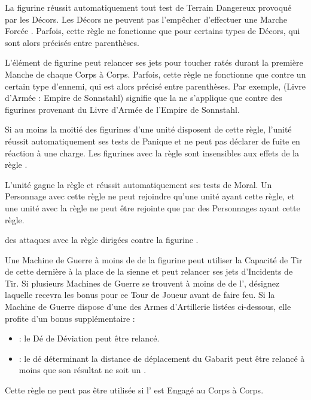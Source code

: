 
La figurine réussit automatiquement tout test de Terrain Dangereux provoqué par les Décors. Les Décors ne peuvent pas l'empêcher d'effectuer une Marche Forcée . Parfois, cette règle ne fonctionne que pour certains types de Décors, qui sont alors précisés entre parenthèses.


L'élément de figurine peut relancer ses jets pour toucher ratés durant la première Manche de chaque Corps à Corps. Parfois, cette règle ne fonctionne que contre un certain type d'ennemi, qui est alors précisé entre parenthèses. Par exemple, \og \hatred{} (Livre d'Armée : Empire de Sonnstahl) \fg{} signifie que la \hatred{} ne s'applique que contre des figurines provenant du Livre d'Armée de l'Empire de Sonnstahl.


Si au moins la moitié des figurines d'une unité disposent de cette règle, l'unité réussit automatiquement ses tests de Panique et ne peut pas déclarer de fuite en réaction à une charge. Les figurines avec la règle \immunetopsychology{} sont insensibles aux effets de la règle \fear{}.


L'unité gagne la règle \immunetopsychology{} et réussit automatiquement ses tests de Moral. Un Personnage avec cette règle ne peut rejoindre qu'une unité ayant cette règle, et une unité avec la règle \unbreakable{} ne peut être rejointe que par des Personnages ayant cette règle.


 des attaques avec la règle \flamingattacks{} dirigées contre la figurine .


Une Machine de Guerre à moins de  de la figurine peut utiliser la Capacité de Tir de cette dernière à la place de la sienne et peut relancer ses jets d'Incidents de Tir. Si plusieurs Machines de Guerre se trouvent à moins de  de l'\engineer{}, désignez laquelle recevra les bonus pour ce Tour de Joueur avant de faire feu. Si la Machine de Guerre dispose d'une des Armes d'Artillerie listées ci-dessous, elle profite d'un bonus supplémentaire :
\begin{itemize}[label={\textbullet}]
\item \catapult{} : le Dé de Déviation peut être relancé.
\item \flamethrower{} : le dé déterminant la distance de déplacement du Gabarit peut être relancé à moins que son résultat ne soit un .
\end{itemize}
Cette règle ne peut pas être utilisée si l'\engineer{} est Engagé au Corps à Corps.

